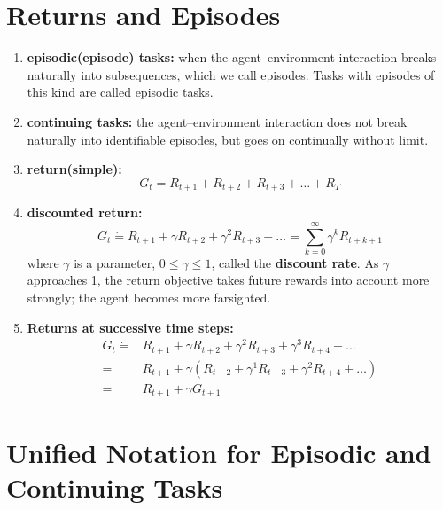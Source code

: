\section{Returns and Episodes}
\begin{enumerate}
    \item \textbf{episodic(episode) tasks:} when the agent–environment interaction breaks naturally into subsequences, which we call episodes. Tasks with episodes of this kind are called episodic tasks.

    \item \textbf{continuing tasks:} the agent–environment interaction does not break naturally into identifiable episodes, but goes on continually without limit.

    \item \textbf{return(simple):}
        \begin{equation}
            G_t \dot{=} R_{t+1}+R_{t+2}+R_{t+3}+\dots+R_T
        \end{equation}

    \item \textbf{discounted return:}
        \begin{equation}
            G_t \dot{=} R_{t+1}+ \gamma R_{t+2} + \gamma^2 R_{t+3} + \dots = \sum_{k=0}^{\infty}\gamma^kR_{t+k+1}
        \end{equation}
    where $\gamma$ is a parameter, $0 \leq \gamma \leq 1$, called the \textbf{discount rate}. As $\gamma$ approaches 1, the return objective takes future rewards into account more strongly; the agent becomes more farsighted.

    \item \textbf{Returns at successive time steps:}
        \begin{equation}
        \begin{split}
            G_t \dot{=} & R_{t+1}+\gamma R_{t+2}+\gamma^2 R_{t+3} + \gamma^3 R_{t+4}+\dots\\
                = &R_{t+1} + \gamma (R_{t+2}+\gamma^1 R_{t+3} + \gamma^2 R_{t+4}+\dots)\\
                = &R_{t+1} + \gamma G_{t+1}
        \end{split}
        \end{equation}

\end{enumerate}

\section{Unified Notation for Episodic and Continuing Tasks}

